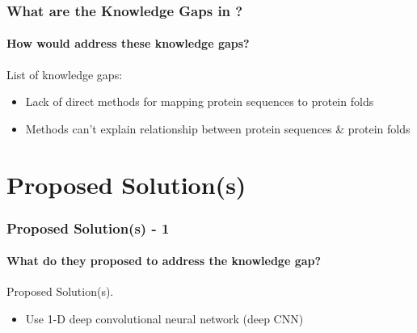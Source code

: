 \documentclass[xcolor={usenames,dvipsnames},hyperref={hyperindex,bookmarks}]{beamer}
\begin{document}







\frame
{
	\frametitle{What are the Knowledge Gaps in \cite{Hou2018}?}
	\framesubtitle{How would \cite{Hou2018} address these knowledge gaps?}

	List of knowledge gaps:
	\begin{itemize}
	\item Lack of direct methods for mapping protein sequences to protein folds
	\item Methods can't explain relationship between protein sequences \& protein folds
	\end{itemize}

}

























\section{Proposed Solution(s)}


\frame
{
	\frametitle{Proposed Solution(s) - 1}
	\framesubtitle{What do they proposed to address the knowledge gap?}

	Proposed Solution(s).
	\begin{itemize}
	\item Use 1-D deep convolutional neural network (deep CNN) 
	\end{itemize}

}
\end{document}
